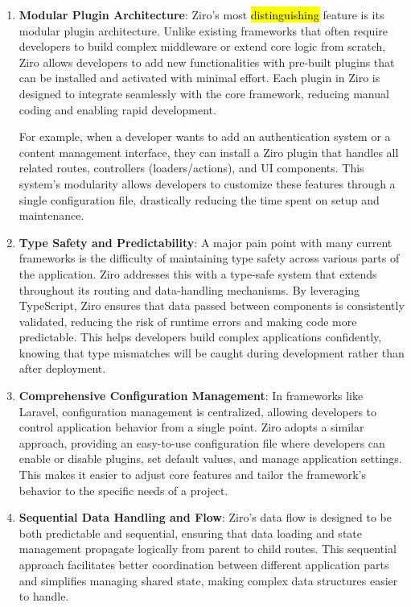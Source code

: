 \begin{enumerate}
	\item \textbf{Modular Plugin Architecture}: Ziro’s most \hl{distinguishing} feature is its modular plugin architecture. Unlike existing frameworks that often require developers to build complex middleware or extend core logic from scratch, Ziro allows developers to add new functionalities with pre-built plugins that can be installed and activated with minimal effort. Each plugin in Ziro is designed to integrate seamlessly with the core framework, reducing manual coding and enabling rapid development.

	For example, when a developer wants to add an authentication system or a content management interface, they can install a Ziro plugin that handles all related routes, controllers (loaders/actions), and UI components. This system’s modularity allows developers to customize these features through a single configuration file, drastically reducing the time spent on setup and maintenance.

	\item \textbf{Type Safety and Predictability}: A major pain point with many current frameworks is the difficulty of maintaining type safety across various parts of the application. Ziro addresses this with a type-safe system that extends throughout its routing and data-handling mechanisms. By leveraging TypeScript, Ziro ensures that data passed between components is consistently validated, reducing the risk of runtime errors and making code more predictable. This helps developers build complex applications confidently, knowing that type mismatches will be caught during development rather than after deployment.
	\item \textbf{Comprehensive Configuration Management}: In frameworks like Laravel, configuration management is centralized, allowing developers to control application behavior from a single point. Ziro adopts a similar approach, providing an easy-to-use configuration file where developers can enable or disable plugins, set default values, and manage application settings. This makes it easier to adjust core features and tailor the framework’s behavior to the specific needs of a project.

	\item \textbf{Sequential Data Handling and Flow}: Ziro’s data flow is designed to be both predictable and sequential, ensuring that data loading and state management propagate logically from parent to child routes. This sequential approach facilitates better coordination between different application parts and simplifies managing shared state, making complex data structures easier to handle.


\end{enumerate}
